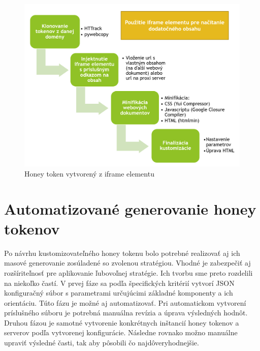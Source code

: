 \documentclass[conference, 11pt,slovak,a4paper,twoside]{IEEEtran}
\begin{document}
\begin{figure}[!t]  %
					\begin{center}
									\includegraphics[width=\linewidth]{fig/iframeToken.png}
									\caption{Honey token vytvorený z iframe elementu}
									\label{iframeToken}
					\end{center}
\end{figure}



\section{Automatizované generovanie honey tokenov}

Po návrhu kustomizovateľného honey tokenu bolo potrebné realizovať aj ich masové generovanie zosúladené so zvolenou stratégiou. Vhodné je zabezpečiť aj rozšíriteľnosť pre aplikovanie ľubovoľnej stratégie. Ich tvorbu sme preto rozdelili na niekoľko častí. V prvej fáze sa podľa špecifických kritérií vytvorí JSON konfiguračný súbor s parametrami určujúcimi základné komponenty a ich orientáciu. Túto fázu je možné aj automatizovať. Pri automatickom vytvorení príslušného súboru je potrebná manuálna revízia a úprava výsledných hodnôt. Druhou fázou je samotné vytvorenie konkrétnych inštancií honey tokenov a serverov podľa vytvorenej konfigurácie. Následne rovnako možno manuálne upraviť výsledné časti, tak aby pôsobili čo najdôveryhodnejšie.
\end{document}

